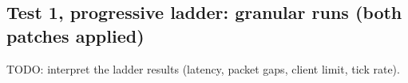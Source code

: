 \IfFileExists{IEEEtran.cls}{\ieeetrue\documentclass[conference]{IEEEtran}}{\ieeefalse\documentclass[twocolumn,10pt]{article}}
\begin{document}
\subsection{Test 1, progressive ladder: granular runs (both patches applied)}
\label{sec:ladder}
TODO: interpret the ladder results (latency, packet gaps, client limit, tick rate).
\end{document}
